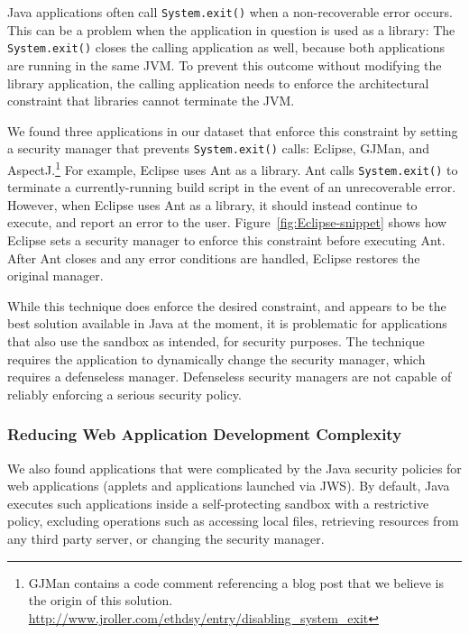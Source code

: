 \documentclass{sig-alternate}
\begin{document}
Java applications often call \texttt{System.exit()} when a non-recoverable
error occurs. This can be a problem when the application in question is 
used as a library: The \texttt{System.exit()} closes the calling
application as well, because both applications
are running in the same JVM. 
To prevent this outcome without modifying the library application,
the calling application needs to enforce the architectural constraint
that libraries cannot terminate the JVM. 

We found three applications in our dataset that 
enforce this constraint by setting a security manager
that prevents \texttt{System.exit()} calls:
Eclipse, GJMan, and AspectJ.\footnote{%
GJMan contains a code comment referencing a
blog post that we believe is the origin of this solution. \url{http://www.jroller.com/ethdsy/entry/disabling_system_exit}}
For example, Eclipse uses Ant as a library.  Ant calls \texttt{System.exit()} to
terminate a currently-running build script in the event of an unrecoverable
error.  However, when Eclipse uses Ant as a library, it
should instead continue to execute, and report an error to the user.
Figure~\ref{fig:Eclipse-snippet} shows
how Eclipse sets a security manager to enforce this constraint
before executing Ant. After Ant closes and any error conditions
are handled, Eclipse restores the original manager.

While this technique does enforce the
desired constraint, and appears to be the best solution available
in Java at the moment, it is problematic for applications that also 
use the sandbox as intended, for security purposes. The technique requires
the application to dynamically change the security manager, which requires a defenseless manager. Defenseless security managers
are not capable of reliably enforcing a serious security policy.

\subsubsection{Reducing Web Application Development Complexity}\label{sub:Reducing-Web-Application-Complexity}

We also found applications that were complicated by the Java security policies
for web applications (applets and applications launched via JWS). By default,
Java executes such applications inside a self-protecting 
sandbox with a restrictive policy, 
excluding operations such as accessing local files, retrieving resources
from any third party server, or changing the security manager. 
\end{document}
